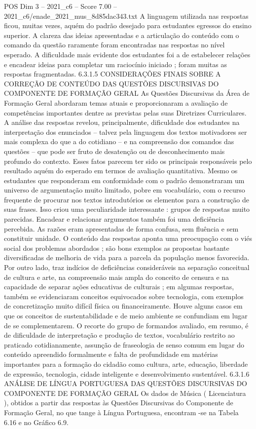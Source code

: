 \begin{textsample}{POS Dim 3 – 2021\_c6 – Score 7.00 – 2021\_c6/enade\_2021\_mus\_8d85dac343.txt}
A linguagem utilizada nas respostas ficou, muitas vezes, aquém do padrão desejado para estudantes egressos do ensino superior.
A clareza das ideias apresentadas e a articulação do conteúdo com o comando da questão raramente foram encontradas nas respostas no nível esperado.
A dificuldade mais evidente dos estudantes foi a de estabelecer relações e encadear ideias para completar um raciocínio iniciado ; foram muitas as respostas fragmentadas. 6.3.1.5 CONSIDERAÇÕES FINAIS SOBRE A CORREÇÃO DE CONTEÚDO DAS QUESTÕES DISCURSIVAS DO COMPONENTE DE FORMAÇÃO GERAL As Questões Discursivas da Área de Formação Geral abordaram temas atuais e proporcionaram a avaliação de competências importantes dentre as previstas pelas suas Diretrizes Curriculares.
A análise das respostas revelou, principalmente, dificuldade dos estudantes na interpretação dos enunciados – talvez pela linguagem dos textos motivadores ser mais complexa do que a do cotidiano – e na compreensão dos comandos das questões – que pode ser fruto de desatenção ou de desconhecimento mais profundo do contexto.
Esses fatos parecem ter sido os principais responsáveis pelo resultado aquém do esperado em termos de avaliação quantitativa.
Mesmo os estudantes que responderam em conformidade com o padrão demonstraram um universo de argumentação muito limitado, pobre em vocabulário, com o recurso frequente de procurar nos textos introdutórios os elementos para a construção de suas frases.
Isso criou uma peculiaridade interessante : grupos de respostas muito parecidas.
Encadear e relacionar argumentos também foi uma deficiência percebida.
As razões eram apresentadas de forma confusa, sem fluência e sem constituir unidade.
O conteúdo das respostas aponta uma preocupação com o viés social dos problemas abordados ; são bons exemplos as propostas bastante diversificadas de melhoria de vida para a parcela da população menos favorecida.
Por outro lado, traz indícios de deficiências consideráveis na separação conceitual de cultura e arte, na compreensão mais ampla do conceito de censura e na capacidade de separar ações educativas de culturais ; em algumas respostas, também se evidenciaram conceitos equivocados sobre tecnologia, com exemplos de concretização muito difícil física ou financeiramente.
Houve alguns casos em que os conceitos de sustentabilidade e de meio ambiente se confundiam em lugar de se complementarem.
O recorte do grupo de formandos avaliado, em resumo, é de dificuldade de interpretação e produção de textos, vocabulário restrito ao praticado cotidianamente, assunção de fraseologia de senso comum em lugar do conteúdo apreendido formalmente e falta de profundidade em matérias importantes para a formação do cidadão como cultura, arte, educação, liberdade de expressão, tecnologia, cidade inteligente e desenvolvimento sustentável. 6.3.1.6 ANÁLISE DE LÍNGUA PORTUGUESA DAS QUESTÕES DISCURSIVAS DO COMPONENTE DE FORMAÇÃO GERAL Os dados de Música ( Licenciatura ), obtidos a partir das respostas às Questões Discursivas do Componente de Formação Geral, no que tange à Língua Portuguesa, encontram -se na Tabela 6.16 e no Gráfico 6.9.

\end{textsample}
